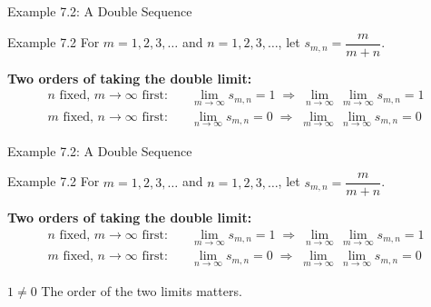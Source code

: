 \documentclass[aspectratio=169,12pt,t]{beamer}
\begin{document}
{%
\begin{frame}{Example 7.2: A Double Sequence}
  \begin{exblock}{Example 7.2}
    For $m = 1, 2, 3, \dots$ and $n = 1, 2, 3, \dots$, let \quad
    $s_{m,n} = \dfrac{m}{m + n}$.
  \end{exblock}
  \begin{hlbox}

  \textbf{Two orders of taking the double limit:}
  \begin{align}
    n \text{ fixed, } m \to \infty \text{ first:}\quad
    & \lim_{m \to \infty} s_{m,n} = 1
    \;\Longrightarrow\; \lim_{n \to \infty}\, \lim_{m \to \infty} s_{m,n} = 1 \tag{4} \\
    m \text{ fixed, } n \to \infty \text{ first:}\quad
    & \lim_{n \to \infty} s_{m,n} = 0
    \;\Longrightarrow\; \lim_{m \to \infty}\, \lim_{n \to \infty} s_{m,n} = 0 \tag{5}
  \end{align}
  \end{hlbox}

\end{frame}

\begin{frame}{Example 7.2: A Double Sequence}
  \begin{exblock}{Example 7.2}
    For $m = 1, 2, 3, \dots$ and $n = 1, 2, 3, \dots$, let \quad
    $s_{m,n} = \dfrac{m}{m + n}$.
  \end{exblock}
  \begin{hlbox}

  \textbf{Two orders of taking the double limit:}
  \begin{align}
    n \text{ fixed, } m \to \infty \text{ first:}\quad
    & \lim_{m \to \infty} s_{m,n} = 1
    \;\Longrightarrow\; \lim_{n \to \infty}\, \lim_{m \to \infty} s_{m,n} = 1 \tag{4} \\
    m \text{ fixed, } n \to \infty \text{ first:}\quad
    & \lim_{n \to \infty} s_{m,n} = 0
    \;\Longrightarrow\; \lim_{m \to \infty}\, \lim_{n \to \infty} s_{m,n} = 0 \tag{5}
  \end{align}

  \begin{center}
    $\boxed{1 \neq 0}$ \quad \alert{The order of the two limits matters.}
  \end{center}
  \end{hlbox}


\end{frame}}
\end{document}

